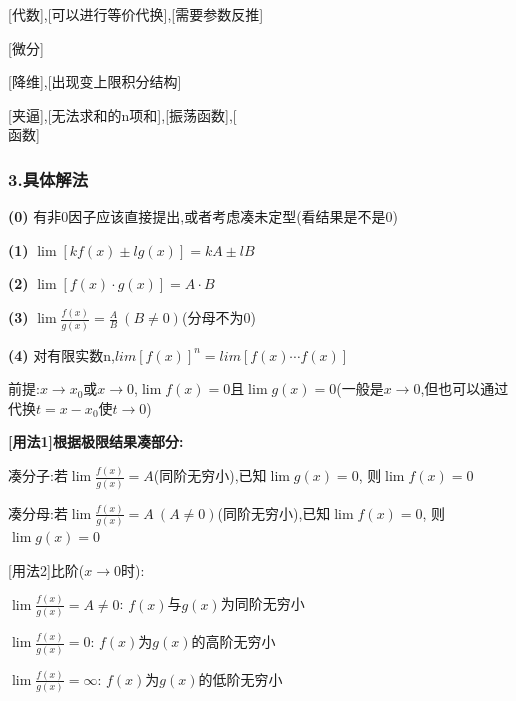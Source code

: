 \documentclass[11pt,a4paper,UTF8]{ctexart}
\begin{document}
[代数]\:[可以提取非0因子],[可以进行等价代换],[需要参数反推]

[微分]

[降维]\:[出现f(b)-f(a)结构],[出现变上限积分结构]

[夹逼]\:[递推数列],[无法求和的n项和],[振荡函数],[
\begin{equation*}
[x]
\end{equation*}
函数]


\subsubsection{3.具体解法}

\begin{thmbox}[{解法[1]: [代数]四则运算}]

\textbf{(0)} 有非0因子应该直接提出,或者考虑凑未定型(看结果是不是0)

\textbf{(1)} $\lim[kf(x) \pm lg(x)] = kA \pm lB$

\textbf{(2)} $\lim[f(x) \cdot g(x)] = A \cdot B$

\textbf{(3)} $\lim\frac{f(x)}{g(x)} = \frac{A}{B}\ (B \ne 0)$(分母不为0)

\textbf{(4)} 对有限实数n,$lim[f(x)]^n = lim[f(x)\cdots f(x)]$

\end{thmbox}
\begin{thmbox}[{解法[2]: [代数]柯西体系比阶[需要趋于0]}]

前提:$x \to x_0$或$x \to 0$,$\lim f(x) = 0$且$\lim g(x) = 0$(一般是$x \to 0$,但也可以通过代换$t = x - x_0$使$t \to 0$)

\textbf{[用法1]根据极限结果凑部分:}

  凑分子:若$\lim \frac{f(x)}{g(x)} = A$(同阶无穷小),已知$\lim g(x) = 0$,	则$\lim f(x) = 0$

  凑分母:若$\lim \frac{f(x)}{g(x)} = A\ (A \neq 0)$(同阶无穷小),已知$\lim f(x) = 0$, 则$\lim g(x) = 0$

\textit{}[用法2]比阶($x \to 0$时):\textit{}

$\lim \frac{f(x)}{g(x)} = A \neq 0$:   $f(x)$与$g(x)$为同阶无穷小

$\lim \frac{f(x)}{g(x)} = 0$:	$f(x)$为$g(x)$的高阶无穷小

$\lim \frac{f(x)}{g(x)} = \infty$:	$f(x)$为$g(x)$的低阶无穷小

\end{thmbox}
\end{document}

